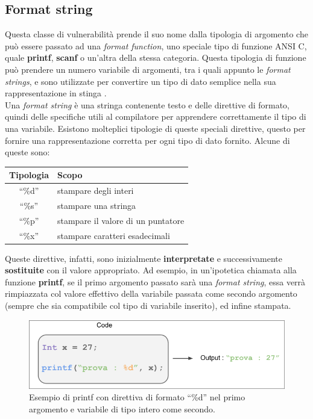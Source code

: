 \subsection{Format string}
\label{subsec:format string}
Questa classe di vulnerabilità prende il suo nome dalla tipologia di argomento che può essere passato ad una \textit{format function}, uno speciale tipo di funzione ANSI C, quale \textbf{printf}, \textbf{scanf} o un'altra della stessa categoria. Questa tipologia di funzione può prendere un numero variabile di
argomenti, tra i quali appunto le \textit{format strings}, e sono utilizzate per convertire un tipo di dato semplice nella sua rappresentazione in stinga \cite*{Formatstring}.\\ 
Una \textit{format string} è una stringa contenente testo e delle direttive di formato, quindi delle specifiche utili al compilatore per apprendere correttamente il tipo di una variabile. Esistono molteplici tipologie di queste speciali direttive, questo per fornire una rappresentazione corretta per ogni tipo di
dato fornito. Alcune di queste sono: 

\begin{table}[h]
    \centering
    \begin{tabular}{ |c|p{6cm}|  }
        \hline
        \textbf{Tipologia} & \textbf{Scopo} \\
        \hline
        ``\%d'' & stampare degli interi \\
        ``\%s'' & stampare una stringa \\
        ``\%p'' & stampare il valore di un puntatore \\
        ``\%x'' & stampare caratteri esadecimali \\
        \hline
    \end{tabular}
\end{table}

Queste direttive, infatti, sono inizialmente \textbf{interpretate} e successivamente \textbf{sostituite} con il valore appropriato. Ad esempio, in un'ipotetica chiamata alla funzione \textbf{printf}, se il primo argomento passato sarà una \textit{format string}, essa verrà rimpiazzata col valore effettivo
della variabile passata come secondo argomento (sempre che sia compatibile col tipo di variabile inserito), ed infine stampata.

\begin{figure}[htpb]
    \centerline{\includegraphics[scale=.5]{images/format string.png}}
    \caption{Esempio di printf con direttiva di formato ``\%d'' nel primo argomento e variabile di tipo intero come secondo.}
    \label{fig:format string}
\end{figure}

